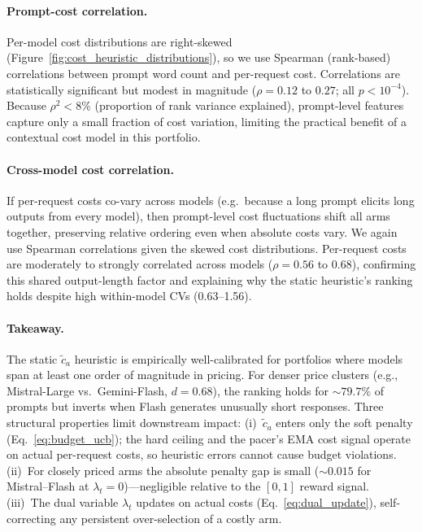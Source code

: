 \paragraph{Prompt-cost correlation.}
Per-model cost distributions are right-skewed
(Figure~\ref{fig:cost_heuristic_distributions}), so we use Spearman
(rank-based) correlations between prompt word count and per-request
cost.
Correlations are statistically significant but modest in magnitude
($\rho = 0.12$ to $0.27$; all $p < 10^{-4}$).
Because $\rho^2 < 8\%$ (proportion of rank variance explained),
prompt-level features capture only a small fraction of cost
variation, limiting the practical benefit of a contextual cost model
in this portfolio.

\paragraph{Cross-model cost correlation.}
If per-request costs co-vary across models (e.g.\ because a long
prompt elicits long outputs from every model), then prompt-level cost
fluctuations shift all arms together, preserving relative ordering
even when absolute costs vary.
We again use Spearman correlations given the skewed cost
distributions.
Per-request costs are moderately to strongly correlated across models
($\rho = 0.56$ to $0.68$), confirming this shared output-length
factor and explaining why the static heuristic's ranking holds
despite high within-model CVs (0.63--1.56).

\paragraph{Takeaway.}
The static $\tilde{c}_a$ heuristic is empirically well-calibrated for
portfolios where models span at least one order of magnitude in
pricing.
For denser price clusters (e.g., Mistral-Large vs.\ Gemini-Flash,
$d = 0.68$), the ranking holds for ${\sim}79.7\%$ of prompts but
inverts when Flash generates unusually short responses.
Three structural properties limit downstream impact:
(i)~$\tilde{c}_a$ enters only the soft penalty
(Eq.~\ref{eq:budget_ucb}); the hard ceiling and the pacer's EMA cost
signal operate on actual per-request costs, so heuristic errors
cannot cause budget violations.
(ii)~For closely priced arms the absolute penalty gap is small
(${\sim}0.015$ for Mistral--Flash at $\lambda_t{=}0$)---negligible
relative to the $[0,1]$ reward signal.
(iii)~The dual variable $\lambda_t$ updates on actual costs
(Eq.~\ref{eq:dual_update}), self-correcting any persistent
over-selection of a costly arm.

